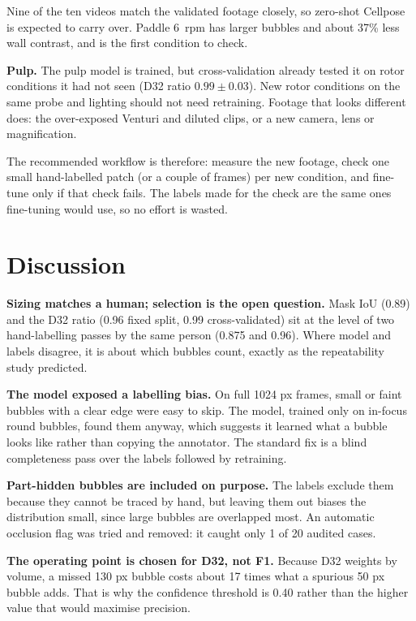 Nine of the ten videos match the validated footage closely, so zero-shot
Cellpose is expected to carry over. Paddle 6~rpm has larger bubbles and
about 37\% less wall contrast, and is the first condition to check.

\textbf{Pulp.} The pulp model is trained, but cross-validation already
tested it on rotor conditions it had not seen (D32 ratio $0.99\pm0.03$).
New rotor conditions on the same probe and lighting should not need
retraining. Footage that looks different does: the over-exposed Venturi
and diluted clips, or a new camera, lens or magnification.

The recommended workflow is therefore: measure the new footage, check one
small hand-labelled patch (or a couple of frames) per new condition, and
fine-tune only if that check fails. The labels made for the check are the
same ones fine-tuning would use, so no effort is wasted.

\hypertarget{discussion}{%
\section{Discussion}\label{discussion}}

\textbf{Sizing matches a human; selection is the open question.} Mask
IoU (0.89) and the D32 ratio (0.96 fixed split, 0.99 cross-validated)
sit at the level of two hand-labelling passes by the same person (0.875
and 0.96). Where model and labels disagree, it is about which bubbles
count, exactly as the repeatability study predicted.

\textbf{The model exposed a labelling bias.} On full 1024 px frames,
small or faint bubbles with a clear edge were easy to skip. The model,
trained only on in-focus round bubbles, found them anyway, which
suggests it learned what a bubble looks like rather than copying the
annotator. The standard fix is a blind completeness pass over the labels
followed by retraining.

\textbf{Part-hidden bubbles are included on purpose.} The labels exclude
them because they cannot be traced by hand, but leaving them out biases
the distribution small, since large bubbles are overlapped most. An
automatic occlusion flag was tried and removed: it caught only 1 of 20
audited cases.

\textbf{The operating point is chosen for D32, not F1.} Because D32
weights by volume, a missed 130 px bubble costs about 17 times what a
spurious 50 px bubble adds. That is why the confidence threshold is 0.40
rather than the higher value that would maximise precision.

